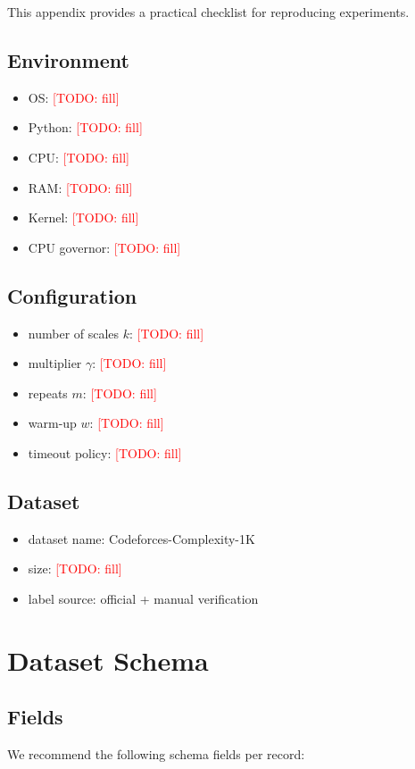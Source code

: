 \documentclass[conference]{IEEEtran}
\newcommand{\datasetname}{Codeforces-Complexity-1K}
\newcommand{\TODO}[1]{\textcolor{red}{[TODO: #1]}}
\begin{document}
This appendix provides a practical checklist for reproducing experiments.

\subsection{Environment}
\begin{itemize}[leftmargin=1.2em]
\item OS: \TODO{fill}
\item Python: \TODO{fill}
\item CPU: \TODO{fill}
\item RAM: \TODO{fill}
\item Kernel: \TODO{fill}
\item CPU governor: \TODO{fill}
\end{itemize}

\subsection{Configuration}
\begin{itemize}[leftmargin=1.2em]
\item number of scales $k$: \TODO{fill}
\item multiplier $\gamma$: \TODO{fill}
\item repeats $m$: \TODO{fill}
\item warm-up $w$: \TODO{fill}
\item timeout policy: \TODO{fill}
\end{itemize}

\subsection{Dataset}
\begin{itemize}[leftmargin=1.2em]
\item dataset name: \datasetname
\item size: \TODO{fill}
\item label source: official + manual verification
\end{itemize}

\section{Dataset Schema}

\subsection{Fields}
We recommend the following schema fields per record:
\end{document}
